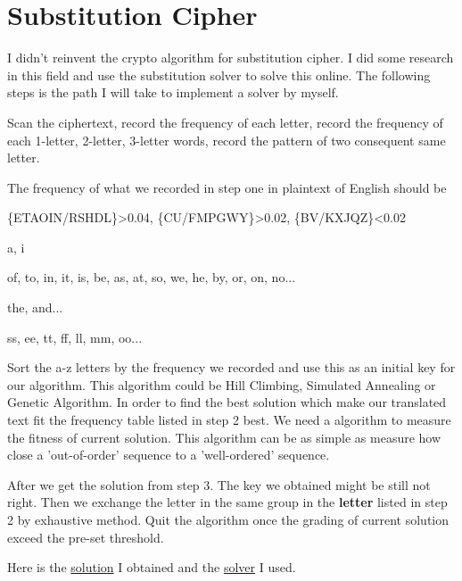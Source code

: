 \documentclass{article}
\begin{document}
\maketitle
\section{Substitution Cipher}
I didn't reinvent the crypto algorithm for substitution cipher. I did some research in this field and use the substitution solver to solve this online. The following steps is the path I will take to implement a solver by myself.
\begin{tlist}{3}
	\item[1.]
	Scan the ciphertext, record the frequency of each letter, record the frequency of each 1-letter, 2-letter, 3-letter words, record the pattern of two consequent same letter.
	\item[2.]
	The frequency of what we recorded in step one in plaintext of English should be
	\begin{tlist}{0}
		\item[letter:]\{ETAOIN/RSHDL\}>0.04, \{CU/FMPGWY\}>0.02, \{BV/KXJQZ\}<0.02
		\item[1-letter word:]a, i
		\item[2-letter word:]of, to, in, it, is, be, as, at, so, we, he, by, or, on, no...
		\item[3-letter word:]the, and...
		\item[consequent pattern:]ss, ee, tt, ff, ll, mm, oo...
	\end{tlist}
	\item[3.]
	Sort the a-z letters by the frequency we recorded and use this as an initial key for our algorithm. This algorithm could be Hill Climbing, Simulated Annealing or Genetic Algorithm. In order to find the best solution which make our translated text fit the frequency table listed in step 2 best. We need a algorithm to measure the fitness of current solution. This algorithm can be as simple as measure how close a 'out-of-order' sequence to a 'well-ordered' sequence.
	\item[4.]
	After we get the solution from step 3. The key we obtained might be still not right. Then we exchange the letter in the same group in the \textbf{letter} listed in step 2 by exhaustive method. Quit the algorithm once the grading of current solution exceed the pre-set threshold.
\end{tlist}
Here is the \href{http://freetexthost.com/j54kutb05a}{solution} I obtained and the \href{https://www.guballa.de/substitution-solver}{solver} I used.
\end{document}
